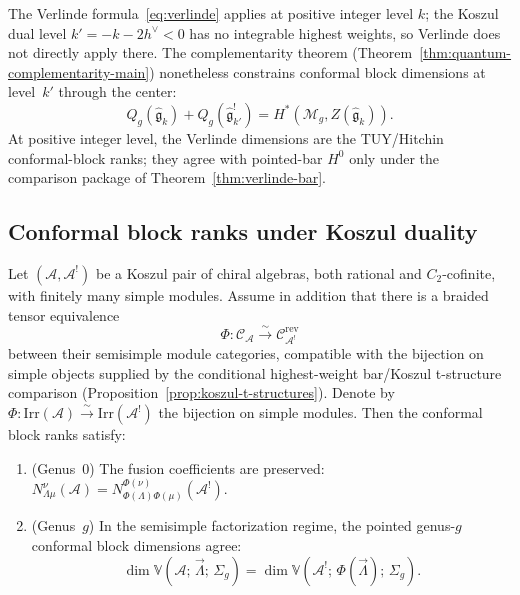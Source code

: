 \begin{remark}
\label{rem:verlinde-koszul}
The Verlinde formula~\eqref{eq:verlinde} applies at positive integer level $k$; the Koszul dual level $k' = -k - 2h^\vee < 0$ has no integrable highest weights, so Verlinde does not directly apply there. The complementarity theorem (Theorem~\ref{thm:quantum-complementarity-main}) nonetheless constrains conformal block dimensions at level~$k'$ through the center:
\[
Q_g(\widehat{\mathfrak{g}}_k) +
Q_g(\widehat{\mathfrak{g}}_{k'}^!)
= H^*(\mathcal{M}_g, Z(\widehat{\mathfrak{g}}_k)).
\]
At positive integer level, the Verlinde dimensions are the TUY/Hitchin
conformal-block ranks; they agree with pointed-bar \(H^0\) only under
the comparison package of Theorem~\ref{thm:verlinde-bar}.
\end{remark}

\subsection{Conformal block ranks under Koszul duality}
\label{sec:conformal-blocks-kd}

\begin{proposition}
\label{prop:conformal-block-duality}
\label{conj:conformal-block-duality}
Let $(\mathcal{A}, \mathcal{A}^!)$ be a Koszul pair of chiral
algebras, both rational and $C_2$-cofinite, with finitely many simple
modules. Assume in addition that there is a braided tensor
equivalence
\[
\Phi\colon \mathcal{C}_{\mathcal{A}}
\xrightarrow{\sim}
\mathcal{C}_{\mathcal{A}^!}^{\mathrm{rev}}
\]
between their semisimple module categories, compatible with the
bijection on simple objects supplied by the conditional
highest-weight bar/Koszul t-structure comparison
\textup{(}Proposition~\textup{\ref{prop:koszul-t-structures})}.
Denote by
$\Phi\colon \mathrm{Irr}(\mathcal{A})
\xrightarrow{\sim} \mathrm{Irr}(\mathcal{A}^!)$ the bijection
on simple modules. Then the conformal block ranks satisfy:
\begin{enumerate}[label=\textup{(\roman*)}]
\item \textup{(}Genus~$0$\textup{)} The fusion coefficients are
 preserved: $N_{\Lambda\mu}^{\nu}(\mathcal{A})
 = N_{\Phi(\Lambda)\Phi(\mu)}^{\Phi(\nu)}(\mathcal{A}^!)$.
\item \textup{(}Genus~$g$\textup{)} In the semisimple factorization
 regime, the pointed genus-$g$ conformal block dimensions agree:
 \[
 \dim \mathbb{V}(\mathcal{A};\, \vec{\Lambda};\, \Sigma_g)
 = \dim \mathbb{V}(\mathcal{A}^!;\, \Phi(\vec{\Lambda});\,
 \Sigma_g).
 \]
\end{enumerate}
\end{proposition}

